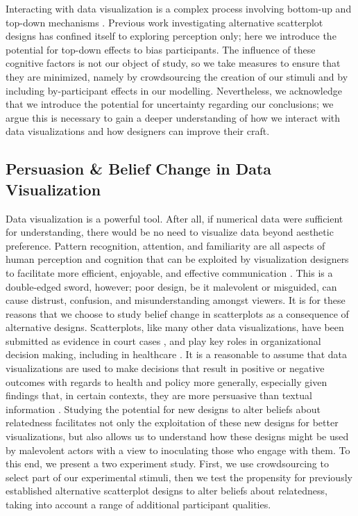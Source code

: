 \documentclass[manuscript,screen,review,anonymous]{acmart}
\begin{document}
Interacting with data visualization is a complex process involving
bottom-up and top-down mechanisms
\citep{shah_2011, franconeri_2021, xiong_2022}. Previous work
investigating alternative scatterplot designs has confined itself to
exploring perception only; here we introduce the potential for top-down
effects to bias participants. The influence of these cognitive factors
is not our object of study, so we take measures to ensure that they are
minimized, namely by crowdsourcing the creation of our stimuli and by
including by-participant effects in our modelling. Nevertheless, we
acknowledge that we introduce the potential for uncertainty regarding
our conclusions; we argue this is necessary to gain a deeper
understanding of how we interact with data visualizations and how
designers can improve their craft.

\subsection{Persuasion \& Belief Change in Data
Visualization}\label{sec-persuasion}

Data visualization is a powerful tool. After all, if numerical data were
sufficient for understanding, there would be no need to visualize data
beyond aesthetic preference. Pattern recognition, attention, and
familiarity are all aspects of human perception and cognition that can
be exploited by visualization designers to facilitate more efficient,
enjoyable, and effective communication \citep{franconeri_2021}. This is
a double-edged sword, however; poor design, be it malevolent or
misguided, can cause distrust, confusion, and misunderstanding amongst
viewers. It is for these reasons that we choose to study belief change
in scatterplots as a consequence of alternative designs. Scatterplots,
like many other data visualizations, have been submitted as evidence in
court cases \citep{bobko_1979}, and play key roles in organizational
decision making, including in healthcare \citep{poly_2019}. It is a
reasonable to assume that data visualizations are used to make decisions
that result in positive or negative outcomes with regards to health and
policy more generally, especially given findings that, in certain
contexts, they are more persuasive than textual information
\citep{pandey_2014}. Studying the potential for new designs to alter
beliefs about relatedness facilitates not only the exploitation of these
new designs for better visualizations, but also allows us to understand
how these designs might be used by malevolent actors with a view to
inoculating those who engage with them. To this end, we present a two
experiment study. First, we use crowdsourcing to select part of our
experimental stimuli, then we test the propensity for previously
established alternative scatterplot designs to alter beliefs about
relatedness, taking into account a range of additional participant
qualities.
\end{document}

